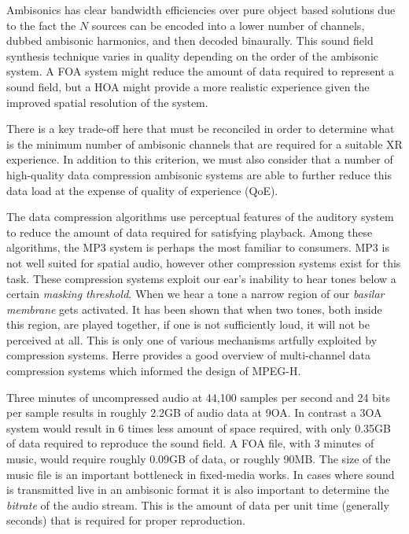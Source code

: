 Ambisonics has clear bandwidth efficiencies over pure object based solutions due to the fact the $N$ sources can be encoded into a lower number of channels, dubbed ambisonic harmonics, and then decoded binaurally. This sound field synthesis technique varies in quality depending on the order of the ambisonic system. A FOA system might reduce the amount of data required to represent a sound field, but a HOA might provide a more realistic experience given the improved spatial resolution of the system.

There is a key trade-off here that must be reconciled in order to determine what is the minimum number of ambisonic channels that are required for a suitable XR experience. In addition to this criterion, we must also consider that a number of high-quality data compression ambisonic systems are able to further reduce this data load at the expense of quality of experience (QoE). 

The data compression algorithms use perceptual features of the auditory system to reduce the amount of data required for satisfying playback. Among these algorithms, the MP3 system is perhaps the most familiar to consumers. MP3 is not well suited for spatial audio, however other compression systems exist for this task. These compression systems exploit our ear's inability to hear tones below a certain \textit{masking threshold}. When we hear a tone a narrow region of our \textit{basilar membrane} gets activated. It has been shown that when two tones, both inside this region, are played together, if one is not sufficiently loud, it will not be perceived at all. This is only one of various mechanisms artfully exploited by compression systems. Herre \cite{herre2015mpeg} provides a good overview of multi-channel data compression systems which informed the design of MPEG-H. 

Three minutes of uncompressed audio at 44,100 samples per second and 24 bits per sample results in roughly 2.2GB of audio data at 9OA. In contrast a 3OA system would result in 6 times less amount of space required, with only 0.35GB of data required to reproduce the sound field. A FOA file, with 3 minutes of music, would require roughly 0.09GB of data, or roughly 90MB. The size of the music file is an important bottleneck in fixed-media works. In cases where sound is transmitted live in an ambisonic format it is also important to determine the \textit{bitrate} of the audio stream. This is the amount of data per unit time (generally seconds) that is required for proper reproduction. 


